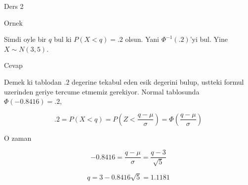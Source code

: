 \documentclass[12pt,fleqn]{article}\usepackage{../common}
\begin{document}
Ders 2

Ornek 

Simdi oyle bir $q$ bul ki $P(X < q) = .2$ olsun. Yani $\Phi^{-1}(.2)$'yi
bul. Yine $X \sim N(3,5)$. 

Cevap 

Demek ki tablodan $.2$ degerine tekabul eden esik degerini bulup, ustteki
formul uzerinden geriye tercume etmemiz gerekiyor. Normal tablosunda
$\Phi(-0.8416) = .2$, 

\[ .2 = P(X<q) = P( Z < \frac{ q - \mu}{\sigma}) = \Phi(\frac{ q - \mu}{\sigma})
\]

O zaman 

\[ -0.8416 = \frac{q - \mu}{\sigma} = \frac{ q - 3}{\sqrt{ 5}} \]

\[ q = 3 - 0.8416 \sqrt{ 5} = 1.1181 \]
\end{document}
